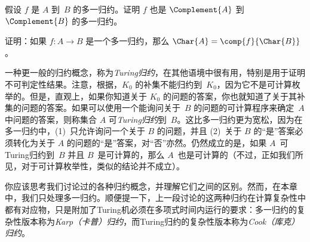 \documentclass[../../../include/open-logic-section]{subfiles}
\begin{document}
\begin{prob}
假设 $f$ 是 $A$ 到~$B$ 的多一归约。证明 $f$ 也是 $\Complement{A}$ 到 $\Complement{B}$ 的多一归约。
\end{prob}

\begin{prob}
证明：如果 $f\colon A \to B$ 是一个多一归约，那么 $\Char{A}
= \comp{f}{\Char{B}}$。
\end{prob}

\begin{digress}
一种更一般的归约概念，称为\emph{Turing归约}，在其他语境中很有用，特别是用于证明不可判定性结果。注意，根据，$K_0$ 的补集不能归约到~$K_0$，因为它不是可计算枚举的。但是，直观上，如果你知道关于 $K_0$ 的问题的答案，你也就知道了关于其补集的问题的答案。如果可以使用一个能询问关于~$B$ 的问题的可计算程序来确定~$A$ 中问题的答案，则称集合 $A$ 可\emph{Turing归约}到~$B$。这比多一归约更为宽松，因为在多一归约中，(1)~只允许询问一个关于 $B$ 的问题，并且 (2)~关于 $B$ 的“是”答案必须转化为关于 $A$ 的问题的“是”答案，对“否”亦然。仍然成立的是，如果 $A$~可Turing归约到~$B$ 并且 $B$~是可计算的，那么 $A$~也是可计算的（不过，正如我们所见，对于可计算枚举性，类似的结论并不成立）。

你应该思考我们讨论过的各种归约概念，并理解它们之间的区别。然而，在本章中，我们只处理多一归约。顺便提一下，上一段讨论的这两种归约在计算复杂性中都有对应物，只是附加了Turing机必须在多项式时间内运行的要求：多一归约的复杂性版本称为\emph{Karp（卡普）归约}，而Turing归约的复杂性版本称为\emph{Cook（库克）归约}。
\end{digress}
\end{document}

